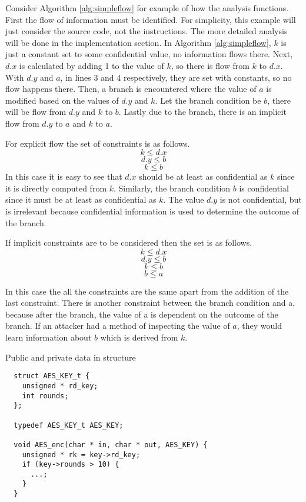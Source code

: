 \documentclass[11pt,a4paper]{article}
\begin{document}
Consider Algorithm \ref{alg:simpleflow} for example of how the analysis
functions. First the flow of information must be identified. For simplicity,
this example will just consider the source code, not the instructions. The more
detailed analysis will be done in the implementation section. In Algorithm
\ref{alg:simpleflow}, $k$ is just a constant set to some confidential value, no
information flows there. Next, $d.x$ is calculated by adding 1 to the value of $k$,
so there is flow from $k$ to $d.x$. With $d.y$ and $a$, in lines 3 and 4 respectively,
they are set with constants, so no flow happens there. Then, a branch is
encountered where the value of $a$ is modified based on the values of $d.y$ and
$k$. Let the branch condition be $b$, there will be flow from $d.y$ and $k$ to
$b$. Lastly due to the branch, there is an implicit flow from $d.y$ to $a$ and $k$ to
$a$.

For explicit flow the set of constraints is as follows.
\[
  k \leq d.x
\]
\[
  d.y \leq b
\]
\[
  k \leq b
\]
In this case it is easy to see that $d.x$ should be at least as confidential as $k$
since it is directly computed from $k$. Similarly, the branch condition $b$ is
confidential since it must be at least as confidential as $k$. The value $d.y$
is not confidential, but is irrelevant because confidential information is used
to determine the outcome of the branch. 

If implicit constraints are to be considered then the set is as follows.
\[
  k \leq d.x
\]
\[
  d.y \leq b
\]
\[
  k \leq b
\]
\[
  b \leq a
\]

In this case the all the constraints are the same apart from the addition of the
last constraint. There is another constraint between the branch condition and a,
because after the branch, the value of a is dependent on the outcome of the
branch. If an attacker had a method of inspecting the value of $a$, they would
learn information about $b$ which is derived from $k$.

\begin{algorithm}
  \caption{Public and private data in structure}
  \label{alg:aes_struclt}
  \begin{lstlisting}
  struct AES_KEY_t {
    unsigned * rd_key;
    int rounds;
  };

  typedef AES_KEY_t AES_KEY;

  void AES_enc(char * in, char * out, AES_KEY) {
    unsigned * rk = key->rd_key;
    if (key->rounds > 10) {
      ...;
    }
  }
  \end{lstlisting}
\end{algorithm}
\end{document}
